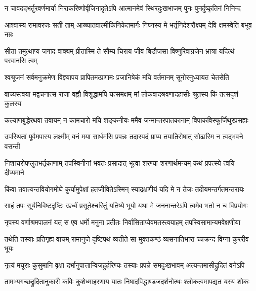 \fourlineindentedshloka
{न चावदद्भर्तुरवर्णमार्या}
{निराकरिष्णोर्वृजिनादृतेऽपि}
{आत्मानमेवं स्थिरदुःखभाजम्}
{पुनः पुनर्दुष्कृतिनं निनिन्द} %

\fourlineindentedshloka
{आश्वास्य रामावरजः सतीं ताम्}
{आख्यातवाल्मीकिनिकेतमार्गः}
{निघ्नस्य मे भर्तृनिदेशरौक्ष्यम्}
{देवि क्षमस्वेति बभूव नम्रः} %

\fourlineindentedshloka
{सीता तमुत्थाप्य जगाद वाक्यम्}
{प्रीतास्मि ते सौम्य चिराय जीव}
{बिडौजसा विष्णुरिवाग्रजेन}
{भ्रात्रा यदित्थं परवानसि त्वम्} %

\fourlineindentedshloka
{श्वश्रूजनं सर्वमनुक्रमेण}
{विज्ञ्यापय प्रापितमत्प्रणामः}
{प्रजानिषेकं मयि वर्तमानम्}
{सूनोरनुध्यायत चेतसेति} %

\fourlineindentedshloka
{वाच्यस्त्वया मद्वचनात्स राजा}
{वह्नौ विशुद्धामपि यत्समक्षम्}
{मां लोकवादश्रवणादहासीः}
{श्रुतस्य किं तत्सदृशं कुलस्य} %

\fourlineindentedshloka
{कल्याणबुद्धेरथवा तवायम्}
{न कामचारो मयि शङ्कनीयः}
{ममैव जन्मान्तरपातकानाम्}
{विपाकविस्फूर्जिथुरप्रसह्यः} %

\fourlineindentedshloka
{उपस्थितां पूर्वमपास्य लक्ष्मीम्}
{वनं मया सार्धमसि प्रपन्नः}
{तदास्पदं प्राप्य तयातिरोषात्}
{सोढास्मि न त्वद्भवने वसन्ती} %

\fourlineindentedshloka
{निशाचरोपप्लुतभर्तृकाणाम्}
{तपस्विनीनां भवतः प्रसादात्}
{भूत्वा शरण्या शरणार्थमन्यम्}
{कथं प्रपत्स्ये त्वयि दीप्यमाने} %

\fourlineindentedshloka
{किंवा तवात्यन्तवियोगमोघे}
{कुर्यामुपेक्षां हतजीवितेऽस्मिन्}
{स्याद्रक्षणीयं यदि मे न तेजः}
{तदीयमन्तर्गतमन्तरायः} %

\fourlineindentedshloka
{साहं तपः सूर्यनिविष्टदृष्टिः}
{ऊर्ध्वं प्रसूतेश्चरितुं यतिष्ये}
{भूयो यथा मे जननान्तरेऽपि}
{त्वमेव भर्ता न च विप्रयोगः} %

\fourlineindentedshloka
{नृपस्य वर्णाश्रमपालनं यत्}
{स एव धर्मो मनुना प्रतीतः}
{निर्वासिताप्येवमतस्त्वयाहम्}
{तपस्विसामान्यमवेक्षणीया} %

\fourlineindentedshloka
{तथेति तस्याः प्रतिगृह्य वाचम्}
{रामानुजे दृष्टिपथं व्यतीते}
{सा मुक्तकण्ठं व्यसनातिभारा}
{च्चक्रन्द विग्ना कुररीव भूयः} %

\fourlineindentedshloka
{नृत्यं मयूराः कुसुमानि वृक्षा}
{दर्भानुपात्तान्विजहुर्हरिण्यः}
{तस्याः प्रपन्ने समदुःखभावम्}
{अत्यन्तमासीद्रुदितं वनेऽपि} %

\fourlineindentedshloka
{तामभ्यगच्छद्रुदितानुकारी}
{कविः कुशेध्माहरणाय यातः}
{निषादविद्धाण्डजदर्शनोत्थः}
{श्लोकत्वमापद्यत यस्य शोकः} %

